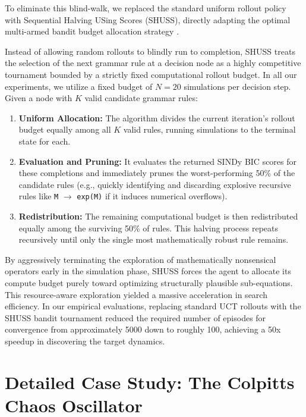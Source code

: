 \documentclass[11pt, a4paper]{article}
\begin{document}
To eliminate this blind-walk, we replaced the standard uniform rollout policy with Sequential Halving USing Scores (SHUSS), directly adapting the optimal multi-armed bandit budget allocation strategy \cite{cazenave2022SHUSS}. 

Instead of allowing random rollouts to blindly run to completion, SHUSS treats the selection of the next grammar rule at a decision node as a highly competitive tournament bounded by a strictly fixed computational rollout budget. In all our experiments, we utilize a fixed budget of $N=20$ simulations per decision step. Given a node with $K$ valid candidate grammar rules:
\begin{enumerate}
    \item \textbf{Uniform Allocation:} The algorithm divides the current iteration's rollout budget equally among all $K$ valid rules, running simulations to the terminal state for each.
    \item \textbf{Evaluation and Pruning:} It evaluates the returned SINDy BIC scores for these completions and immediately prunes the worst-performing 50\% of the candidate rules (e.g., quickly identifying and discarding explosive recursive rules like \texttt{M} $\rightarrow$  \texttt{exp(M)} if it induces numerical  overflows).
    \item \textbf{Redistribution:} The remaining computational budget is then redistributed equally among the surviving 50\% of rules. This halving process repeats recursively until only the single most mathematically robust rule remains.
\end{enumerate}

By aggressively terminating the exploration of mathematically nonsensical operators early in the simulation phase, SHUSS forces the agent to allocate its compute budget purely toward optimizing structurally plausible sub-equations. This resource-aware exploration yielded a massive acceleration in search efficiency. In our empirical evaluations, replacing standard UCT rollouts with the SHUSS bandit tournament reduced the required number of episodes for convergence from approximately 5000 down to roughly 100, achieving a 50x speedup in discovering the target dynamics.


\section{Detailed Case Study: The Colpitts Chaos Oscillator}
\label{sec:experiments}
\end{document}
